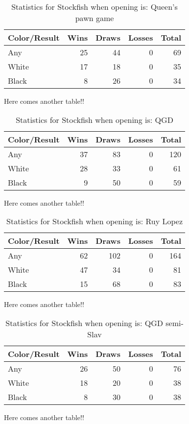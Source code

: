 \documentclass{article}
\begin{document}
\begin{table}[h!]
\centering
\begin{tabular}{l|rrrr}
Color/Result & Wins & Draws & Losses & Total\\
\hline
Any & 25 & 44 & 0 & 69\\
White & 17 & 18 & 0 & 35\\
Black & 8 & 26 & 0 & 34\\
\end{tabular}
\caption{Statistics for Stockfish when opening is: Queen's pawn game}
\end{table}
Here comes another table!!

\begin{table}[h!]
\centering
\begin{tabular}{l|rrrr}
Color/Result & Wins & Draws & Losses & Total\\
\hline
Any & 37 & 83 & 0 & 120\\
White & 28 & 33 & 0 & 61\\
Black & 9 & 50 & 0 & 59\\
\end{tabular}
\caption{Statistics for Stockfish when opening is: QGD}
\end{table}
Here comes another table!!

\begin{table}[h!]
\centering
\begin{tabular}{l|rrrr}
Color/Result & Wins & Draws & Losses & Total\\
\hline
Any & 62 & 102 & 0 & 164\\
White & 47 & 34 & 0 & 81\\
Black & 15 & 68 & 0 & 83\\
\end{tabular}
\caption{Statistics for Stockfish when opening is: Ruy Lopez}
\end{table}
Here comes another table!!

\begin{table}[h!]
\centering
\begin{tabular}{l|rrrr}
Color/Result & Wins & Draws & Losses & Total\\
\hline
Any & 26 & 50 & 0 & 76\\
White & 18 & 20 & 0 & 38\\
Black & 8 & 30 & 0 & 38\\
\end{tabular}
\caption{Statistics for Stockfish when opening is: QGD semi-Slav}
\end{table}
Here comes another table!!
\end{document}
